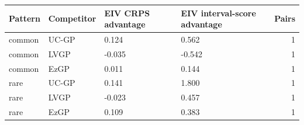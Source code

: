 
\begin{tabular}{llllr}
\toprule
Pattern & Competitor & EIV CRPS advantage & EIV interval-score advantage & Pairs\\
\midrule
common & UC-GP & 0.124 & 0.562 & 1\\
common & LVGP & -0.035 & -0.542 & 1\\
common & EzGP & 0.011 & 0.144 & 1\\
rare & UC-GP & 0.141 & 1.800 & 1\\
rare & LVGP & -0.023 & 0.457 & 1\\
\addlinespace
rare & EzGP & 0.109 & 0.383 & 1\\
\bottomrule
\end{tabular}
